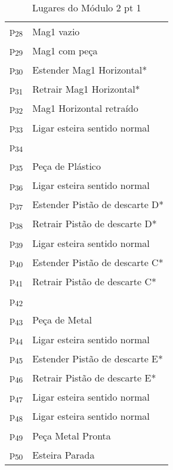 \begin{table}[htbp]
\caption{Lugares do Módulo 2 pt 1}
\centering
\begin{tabular}{ll}
p\textsubscript{28} & Mag1 vazio\\
p\textsubscript{29} & Mag1 com peça\\
p\textsubscript{30} & Estender Mag1 Horizontal*\\
p\textsubscript{31} & Retrair Mag1 Horizontal*\\
p\textsubscript{32} & Mag1 Horizontal retraído\\
p\textsubscript{33} & Ligar esteira sentido normal\\
p\textsubscript{34} & \\
p\textsubscript{35} & Peça de Plástico\\
p\textsubscript{36} & Ligar esteira sentido normal\\
p\textsubscript{37} & Estender Pistão de descarte D*\\
p\textsubscript{38} & Retrair Pistão de descarte D*\\
p\textsubscript{39} & Ligar esteira sentido normal\\
p\textsubscript{40} & Estender Pistão de descarte C*\\
p\textsubscript{41} & Retrair Pistão de descarte C*\\
p\textsubscript{42} & \\
p\textsubscript{43} & Peça de Metal\\
p\textsubscript{44} & Ligar esteira sentido normal\\
p\textsubscript{45} & Estender Pistão de descarte E*\\
p\textsubscript{46} & Retrair Pistão de descarte E*\\
p\textsubscript{47} & Ligar esteira sentido normal\\
p\textsubscript{48} & Ligar esteira sentido normal\\
p\textsubscript{49} & Peça Metal Pronta\\
p\textsubscript{50} & Esteira Parada\\
\end{tabular}
\end{table}

